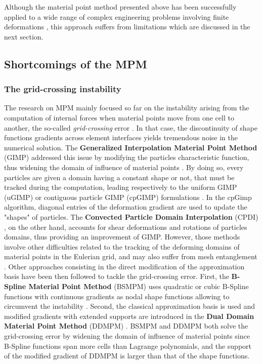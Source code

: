 Although the material point method presented above has been successfully applied to a wide range of complex engineering problems involving finite deformations \cite{Wieckowski}, this approach suffers from limitations which are discussed in the next section. 

\subsection{Shortcomings of the MPM}

\subsubsection*{The grid-crossing instability}
The research on MPM mainly focused so far on the instability arising from the computation of internal forces when material points move from one cell to another, the so-called \textit{grid-crossing} error \cite{Gimp}. In that case, the discontinuity of shape functions gradients across element interfaces yields tremendous noise in the numerical solution. The \textbf{Generalized Interpolation Material Point Method} (GIMP) addressed this issue by modifying the particles characteristic function, thus widening the domain of influence of material points \cite{Gimp}. By doing so, every particles are given a domain having a constant shape or not, that must be tracked during the computation, leading respectively to the uniform GIMP (uGIMP) or contiguous particle GIMP (cpGIMP) formulations \cite{Book_MPM}. In the cpGimp algorithm, diagonal entries of the deformation gradient are used to update the "shapes" of particles. The \textbf{Convected Particle Domain Interpolation} (CPDI) \cite{CPDI}, on the other hand, accounts for shear deformations and rotations of particles domains, thus providing an improvement of GIMP. However, those methods involve other difficulties related to the tracking of the deforming domains of material points in the Eulerian grid, and may also suffer from mesh entanglement \cite{DDMPM0}. Other approaches consisting in the direct modification of the approximation basis have been then followed to tackle the grid-crossing error. First, the \textbf{B-Spline Material Point Method} (BSMPM) \cite{Steffen_quadError} uses quadratic or cubic B-Spline functions with continuous gradients as nodal shape functions allowing to circumvent the instability \cite{MPM_BSpline1}. %
Second, the classical approximation basis is used and modified gradients with extended supports are introduced in the \textbf{Dual Domain Material Point Method} (DDMPM) \cite{DDMPM0}. BSMPM and DDMPM  both solve the grid-crossing error by widening the domain of influence of material points since B-Spline functions span more cells than Lagrange polynomials, and the support of the modified gradient of DDMPM is larger than that of the shape functions.  

